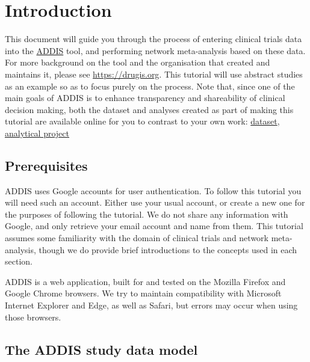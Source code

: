 \documentclass[12pt]{article}
\begin{document}
\maketitle

\tableofcontents

\section{Introduction}

This document will guide you through the process of entering clinical trials data into the \href{https://addis.drugis.org}{ADDIS} tool, and performing network meta-analysis based on these data.
For more background on the tool and the organisation that created and maintains it, please see \href{https://drugis.org}{https://drugis.org}.
This tutorial will use abstract studies as an example so as to focus purely on the process.
Note that, since one of the main goals of ADDIS is to enhance transparency and shareability of clinical decision making, both the dataset and analyses created as part of making this tutorial are available online for you to contrast to your own work:
\href{https://addis.drugis.org/#/users/12/datasets/c190e953-051c-4cf5-ac10-332984a14a43/versions/7e3468aa-dc7a-456b-ae08-18a1f1492c2e}{dataset}, \href{https://addis.drugis.org/#/users/12/projects/1431/nma/3199}{analytical project}
\subsection{Prerequisites}

ADDIS uses Google accounts for user authentication.
To follow this tutorial you will need such an account.
Either use your usual account, or create a new one for the purposes of following the tutorial.
We do not share any information with Google, and only retrieve your email account and name from them.
This tutorial assumes some familiarity with the domain of clinical trials and network meta-analysis, though we do provide brief introductions to the concepts used in each section.

ADDIS is a web application, built for and tested on the Mozilla Firefox and Google Chrome browsers.
We try to maintain compatibility with Microsoft Internet Explorer and Edge, as well as Safari, but errors may occur when using those browsers.

\subsection{The ADDIS study data model}
\end{document}
